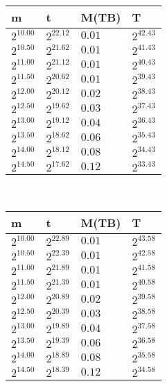\begin{tabular}{llll}
m & t & M(TB) & T \\ \hline
$2^{10.00}$ & $2^{22.12}$ & $0.01$ & $2^{42.43}$ \\
$2^{10.50}$ & $2^{21.62}$ & $0.01$ & $2^{41.43}$ \\
$2^{11.00}$ & $2^{21.12}$ & $0.01$ & $2^{40.43}$ \\
$2^{11.50}$ & $2^{20.62}$ & $0.01$ & $2^{39.43}$ \\
$2^{12.00}$ & $2^{20.12}$ & $0.02$ & $2^{38.43}$ \\
$2^{12.50}$ & $2^{19.62}$ & $0.03$ & $2^{37.43}$ \\
$2^{13.00}$ & $2^{19.12}$ & $0.04$ & $2^{36.43}$ \\
$2^{13.50}$ & $2^{18.62}$ & $0.06$ & $2^{35.43}$ \\
$2^{14.00}$ & $2^{18.12}$ & $0.08$ & $2^{34.43}$ \\
$2^{14.50}$ & $2^{17.62}$ & $0.12$ & $2^{33.43}$ \\
\end{tabular}
 \ 
\begin{tabular}{llll}
m & t & M(TB) & T \\ \hline
$2^{10.00}$ & $2^{22.89}$ & $0.01$ & $2^{43.58}$ \\
$2^{10.50}$ & $2^{22.39}$ & $0.01$ & $2^{42.58}$ \\
$2^{11.00}$ & $2^{21.89}$ & $0.01$ & $2^{41.58}$ \\
$2^{11.50}$ & $2^{21.39}$ & $0.01$ & $2^{40.58}$ \\
$2^{12.00}$ & $2^{20.89}$ & $0.02$ & $2^{39.58}$ \\
$2^{12.50}$ & $2^{20.39}$ & $0.03$ & $2^{38.58}$ \\
$2^{13.00}$ & $2^{19.89}$ & $0.04$ & $2^{37.58}$ \\
$2^{13.50}$ & $2^{19.39}$ & $0.06$ & $2^{36.58}$ \\
$2^{14.00}$ & $2^{18.89}$ & $0.08$ & $2^{35.58}$ \\
$2^{14.50}$ & $2^{18.39}$ & $0.12$ & $2^{34.58}$ \\
\end{tabular}
 \ 
